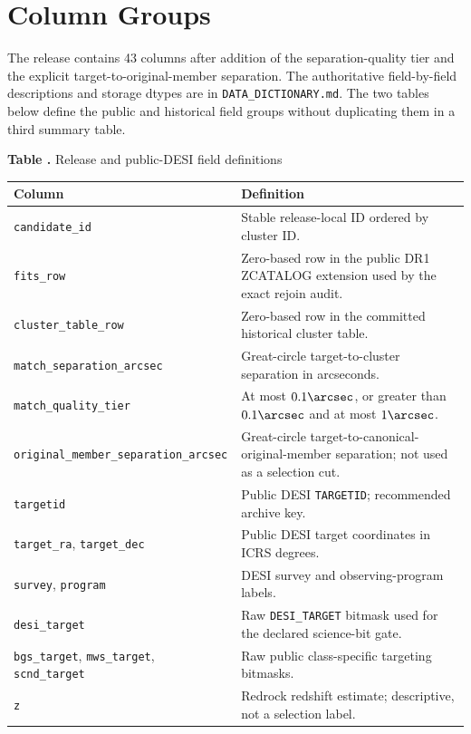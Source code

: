 \documentclass[twocolumn]{aastex701}
\begin{document}
\section{Column Groups}\label{app:columns}

The release contains 43 columns after addition of the separation-quality tier and the explicit
target-to-original-member separation.  The authoritative
field-by-field descriptions and storage dtypes are in \texttt{DATA\_DICTIONARY.md}.  The two
tables below define the public and historical field groups without duplicating them in a third
summary table.

\clearpage
{}\label{tab:public-fields}
\begin{center}
\textbf{Table \thetable.} Release and public-DESI field definitions

\smallskip
\scriptsize
\begin{tabular}{p{}p{}}
\toprule
Column & Definition \\
\midrule
\texttt{candidate\_id} & Stable release-local ID ordered by cluster ID. \\
\texttt{fits\_row} & Zero-based row in the public DR1 ZCATALOG extension used by the exact rejoin audit. \\
\texttt{cluster\_table\_row} & Zero-based row in the committed historical cluster table. \\
\texttt{match\_separation\_arcsec} & Great-circle target-to-cluster separation in arcseconds. \\
\texttt{match\_quality\_tier} & At most $0.1\arcsec$, or greater than $0.1\arcsec$ and at most $1\arcsec$. \\
\texttt{original\_member\_separation\_arcsec} & Great-circle target-to-canonical-original-member separation; not used as a selection cut. \\
\texttt{targetid} & Public DESI \texttt{TARGETID}; recommended archive key. \\
\texttt{target\_ra}, \texttt{target\_dec} & Public DESI target coordinates in ICRS degrees. \\
\texttt{survey}, \texttt{program} & DESI survey and observing-program labels. \\
\texttt{desi\_target} & Raw \texttt{DESI\_TARGET} bitmask used for the declared science-bit gate. \\
\texttt{bgs\_target}, \texttt{mws\_target}, \texttt{scnd\_target} & Raw public class-specific targeting bitmasks. \\
\texttt{z} & Redrock redshift estimate; descriptive, not a selection label. \\

\end{tabular}
\end{center}
\end{document}
